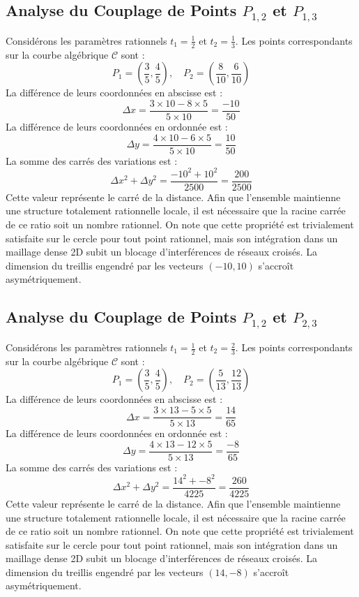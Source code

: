 \documentclass[12pt, a4paper]{article}
\begin{document}
\subsection{Analyse du Couplage de Points $P_{1,2}$ et $P_{1,3}$}
Considérons les paramètres rationnels $t_1 = \frac{1}{2}$ et $t_2 = \frac{1}{3}$.
Les points correspondants sur la courbe algébrique $\mathcal{C}$ sont :
$$ P_1 = \left( \frac{3}{5}, \frac{4}{5} \right), \quad P_2 = \left( \frac{8}{10}, \frac{6}{10} \right) $$
La différence de leurs coordonnées en abscisse est :
$$ \Delta x = \frac{3 \times 10 - 8 \times 5}{5 \times 10} = \frac{-10}{50} $$
La différence de leurs coordonnées en ordonnée est :
$$ \Delta y = \frac{4 \times 10 - 6 \times 5}{5 \times 10} = \frac{10}{50} $$
La somme des carrés des variations est :
$$ \Delta x^2 + \Delta y^2 = \frac{ -10^2 + 10^2 }{ 2500 } = \frac{ 200 }{ 2500 } $$
Cette valeur représente le carré de la distance. Afin que l'ensemble maintienne une structure totalement rationnelle locale, il est nécessaire que la racine carrée de ce ratio soit un nombre rationnel. On note que cette propriété est trivialement satisfaite sur le cercle pour tout point rationnel, mais son intégration dans un maillage dense 2D subit un blocage d'interférences de réseaux croisés. La dimension du treillis engendré par les vecteurs $( -10, 10 )$ s'accroît asymétriquement.


\subsection{Analyse du Couplage de Points $P_{1,2}$ et $P_{2,3}$}
Considérons les paramètres rationnels $t_1 = \frac{1}{2}$ et $t_2 = \frac{2}{3}$.
Les points correspondants sur la courbe algébrique $\mathcal{C}$ sont :
$$ P_1 = \left( \frac{3}{5}, \frac{4}{5} \right), \quad P_2 = \left( \frac{5}{13}, \frac{12}{13} \right) $$
La différence de leurs coordonnées en abscisse est :
$$ \Delta x = \frac{3 \times 13 - 5 \times 5}{5 \times 13} = \frac{14}{65} $$
La différence de leurs coordonnées en ordonnée est :
$$ \Delta y = \frac{4 \times 13 - 12 \times 5}{5 \times 13} = \frac{-8}{65} $$
La somme des carrés des variations est :
$$ \Delta x^2 + \Delta y^2 = \frac{ 14^2 + -8^2 }{ 4225 } = \frac{ 260 }{ 4225 } $$
Cette valeur représente le carré de la distance. Afin que l'ensemble maintienne une structure totalement rationnelle locale, il est nécessaire que la racine carrée de ce ratio soit un nombre rationnel. On note que cette propriété est trivialement satisfaite sur le cercle pour tout point rationnel, mais son intégration dans un maillage dense 2D subit un blocage d'interférences de réseaux croisés. La dimension du treillis engendré par les vecteurs $( 14, -8 )$ s'accroît asymétriquement.
\end{document}
